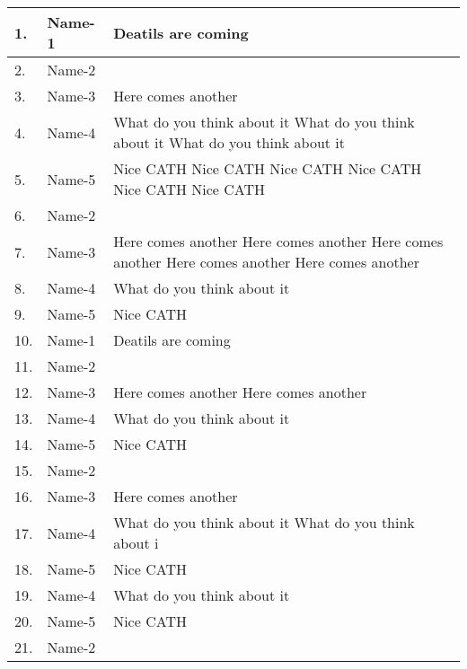 \documentclass{article}
\begin{document}
\begin{landscape}
\begin{longtable}{|p{2cm}| p{4cm}| p{12cm}|}
				\endhead
				\hline
				1.       & Name-1                        & Deatils are coming \\ \hline
				2.      & Name-2                        & \\  \hline
				3.      & Name-3                        & Here comes another \\ \hline
				4.      & Name-4                        & What do you think about it What do you think about it What do you think about it \\  \hline
				5.      & Name-5                        & Nice CATH Nice CATH Nice CATH Nice CATH Nice CATH Nice CATH\\   \hline
				6.      & Name-2                         & \\  \hline
				7.      & Name-3                         & Here comes another Here comes another Here comes another Here comes another Here comes another \\ \hline
				8.      & Name-4                         & What do you think about it \\  \hline
				9.      & Name-5                         & Nice CATH \\   \hline
				10.       & Name-1                       & Deatils are coming \\ \hline
				11.      & Name-2                        & \\  \hline
				12.      & Name-3                        & Here comes another  Here comes another\\ \hline
				13.      & Name-4                        & What do you think about it \\  \hline
				14.      & Name-5                        & Nice CATH \\   \hline
				15.      & Name-2                        & \\  \hline
				16.      & Name-3                        & Here comes another \\ \hline
				17.      & Name-4                        & What do you think about it What do you think about i \\  \hline
				18.      & Name-5                        & Nice CATH \\   \hline
				19.      & Name-4                        & What do you think about it \\  \hline
				20.      & Name-5                        & Nice CATH \\   \hline
				21.      & Name-2                        & \\  \hline

\end{longtable}
\end{landscape}
\end{document}
